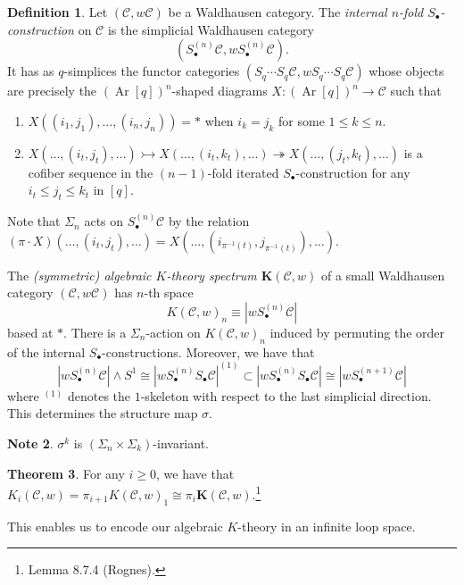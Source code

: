 \documentclass[10pt,letterpaper,cm]{nupset}
\theoremstyle{definition}
\newtheorem{definition}{Definition}[section]
\newtheorem{note}[definition]{Note}
\theoremstyle{theorem}
\newtheorem{theorem}[definition]{Theorem}
\theoremstyle{remark}
\newcommand{\1}{\mathbf{1}}
\renewcommand{\c}{\mathscr{C}}
\newcommand{\0}{\vec 0}
\DeclareMathOperator{\Ar}{Ar}
\begin{document}
\begin{definition}
Let $\left(\c,w{\c}\right)$ be a Waldhausen category. The \textit{internal $n$-fold $S_{\bullet}$-construction} on $\c$ is the simplicial Waldhausen category $$\left(S_{\bullet}^{(n)}\c, wS_{\bullet}^{(n)} \c\right).$$ It has as $q$-simplices the functor categories $\left(S_q \cdots S_q \c, wS_q \cdots S_q \c\right)$ whose objects are precisely the $\left(\Ar[q]\right)^n$-shaped diagrams  $X: \left(\Ar[q]\right)^n\to \c$ such that
\begin{enumerate}[label=(\roman*)]
\item $X((i_1, j_1), \ldots, (i_n, j_n)) = \ast$ when $i_k = j_k$ for some $1\leq k \leq n$.
\item $X(\ldots, (i_t, j_t), \ldots) \rightarrowtail X(\ldots, (i_t, k_t), \ldots) \twoheadrightarrow X(\ldots, (j_t, k_t), \ldots)$ is a cofiber sequence  in the $\left(n-1\right)$-fold iterated $S_{\bullet}$-construction for any $i_t \leq j_t \leq k_t$ in $\left[q\right]$.
\end{enumerate}
Note that $\Sigma_n$ acts on $S_{\bullet}^{(n)}\c$ by the relation $\left(\pi \cdot X\right)\left(\ldots, \left(i_t, j_t\right), \ldots\right) = X(\ldots, (i_{\pi^{{-1}}(t)}, j_{\pi^{{-1}}(t)}), \ldots)$.
\end{definition}

\medskip


The \textit{(symmetric) algebraic $K$-theory  spectrum $\mathbf{K}(\c, w)$} of a small Waldhausen category $\left(\c,w{\c}\right)$ has $n$-th space $$K(\c, w)_n \equiv \left\lvert{wS_{\bullet}^{(n)}\c}\right\rvert$$ based at $\ast$. There is a $\Sigma_n$-action on $K(\c, w)_n$ induced by permuting the order of the internal $S_{\bullet}$-constructions. Moreover, we have that $$\left\lvert{wS_{\bullet}^{(n)}\c}\right\rvert \land S^1 \cong \left\lvert{wS_{\bullet}^{(n)}S_{\bullet}\c}\right\rvert^{(1)} \subset \left\lvert{wS_{\bullet}^{(n)}S_{\bullet}\c}\right\rvert \cong \left\lvert{wS_{\bullet}^{(n+1)}\c}\right\rvert$$ where $^{(1)}$ denotes the $1$-skeleton with respect to the last simplicial direction. This determines the structure map $\sigma$.

\begin{note}
$\sigma^k$ is $\left(\Sigma_{n} \times \Sigma_{k}\right)$-invariant.
\end{note}



\begin{theorem}\label{lt}
For any $i\geq 0$, we have that $K_i(\c, w) = \pi_{i+1}K(\c, w)_1 \cong \pi_i \mathbf{K}(\c, w)$.\footnote{Lemma 8.7.4 (Rognes).}
\end{theorem}



This enables us to encode our algebraic $K$-theory in an infinite loop space.
\end{document}
